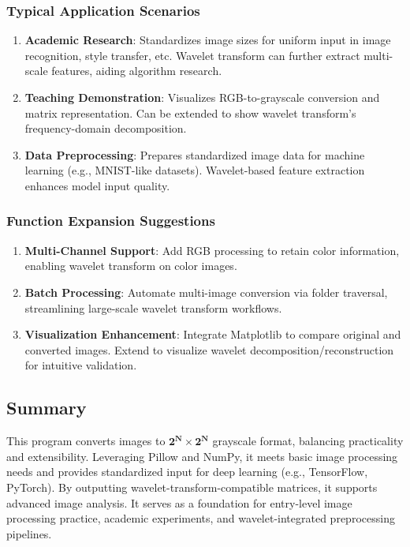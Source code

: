 \documentclass{article}
\theoremstyle{definition} %
\begin{document}
\subsubsection{Typical Application Scenarios}
\begin{enumerate}
    \item \textbf{Academic Research}: Standardizes image sizes for uniform input in image recognition, style transfer, etc. Wavelet transform can further extract multi-scale features, aiding algorithm research.
    \item \textbf{Teaching Demonstration}: Visualizes RGB-to-grayscale conversion and matrix representation. Can be extended to show wavelet transform’s frequency-domain decomposition.
    \item \textbf{Data Preprocessing}: Prepares standardized image data for machine learning (e.g., MNIST-like datasets). Wavelet-based feature extraction enhances model input quality.
\end{enumerate}

\subsubsection{Function Expansion Suggestions}
\begin{enumerate}
    \item \textbf{Multi-Channel Support}: Add RGB processing to retain color information, enabling wavelet transform on color images.
    \item \textbf{Batch Processing}: Automate multi-image conversion via folder traversal, streamlining large-scale wavelet transform workflows.
    \item \textbf{Visualization Enhancement}: Integrate Matplotlib to compare original and converted images. Extend to visualize wavelet decomposition/reconstruction for intuitive validation.
\end{enumerate}


\subsection{Summary}
This program converts images to \(\mathbf{2^N \times 2^N}\) grayscale format, balancing practicality and extensibility. Leveraging Pillow and NumPy, it meets basic image processing needs and provides standardized input for deep learning (e.g., TensorFlow, PyTorch). By outputting wavelet-transform-compatible matrices, it supports advanced image analysis. It serves as a foundation for entry-level image processing practice, academic experiments, and wavelet-integrated preprocessing pipelines.
\end{document}
